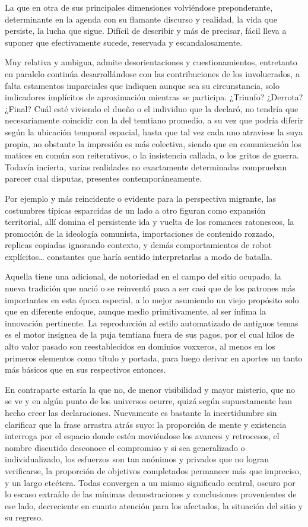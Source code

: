 \documentclass[
]{book}
\begin{document}
La que en otra de sus principales dimensiones volviéndose preponderante, determinante en la agenda con su flamante discurso y realidad, la vida que persiste, la lucha que sigue. Difícil de describir y más de precisar, fácil lleva a suponer que efectivamente sucede, reservada y escandalosamente.

Muy relativa y ambigua, admite desorientaciones y cuestionamientos, entretanto en paralelo continúa desarrollándose con las contribuciones de los involucrados, a falta estamentos imparciales que indiquen aunque sea su circunstancia, solo indicadores implícitos de aproximación mientras se participa. ¿Triunfo? ¿Derrota? ¿Final? Cuál esté viviendo el dueño o el individuo que la declaró, no tendría que necesariamente coincidir con la del temtiano promedio, a su vez que podría diferir según la ubicación temporal espacial, hasta que tal vez cada uno atraviese la suya propia, no obstante la impresión es más colectiva, siendo que en comunicación los matices en común son reiterativos, o la insistencia callada, o los gritos de guerra. Todavía incierta, varias realidades no exactamente determinadas comprueban parecer cual disputas, presentes contemporáneamente.

Por ejemplo y más reincidente o evidente para la perspectiva migrante, las costumbres típicas esparcidas de un lado a otro figuran como expansión territorial, allí domina el persistente ida y vuelta de los romances ratonescos, la promoción de la ideología comunista, importaciones de contenido rozzado, replicas copiadas ignorando contexto, y demás comportamientos de robot explícitos\ldots{} constantes que haría sentido interpretarlas a modo de batalla.

Aquella tiene una adicional, de notoriedad en el campo del sitio ocupado, la nueva tradición que nació o se reinventó pasa a ser casi que de los patrones más importantes en esta época especial, a lo mejor asumiendo un viejo propósito solo que en diferente enfoque, aunque medio primitivamente, al ser ínfima la innovación pertinente. La reproducción al estilo automatizado de antiguos temas es el motor insignea de la puja temtiana fuera de sus pagos, por el cual hilos de alto valor pasado son reestablecidos en dominios voxxeros, al menos en los primeros elementos como título y portada, para luego derivar en aportes un tanto más básicos que en sus respectivos entonces.

En contraparte estaría la que no, de menor visibilidad y mayor misterio, que no se ve y en algún punto de los universos ocurre, quizá según supuestamente han hecho creer las declaraciones. Nuevamente es bastante la incertidumbre sin clarificar que la frase arrastra atrás suyo: la proporción de mente y existencia interroga por el espacio donde estén moviéndose los avances y retrocesos, el nombre discutido desconoce el compromiso y si sea generalizado o individualizado, los esfuerzos son tan anónimos y privados que no logran verificarse, la proporción de objetivos completados permanece más que impreciso, y un largo etcétera. Todas convergen a un mismo significado central, oscuro por lo escaso extraído de las mínimas demostraciones y conclusiones provenientes de ese lado, decreciente en cuanto atención para los afectados, la situación del sitio y su regreso.
\end{document}
